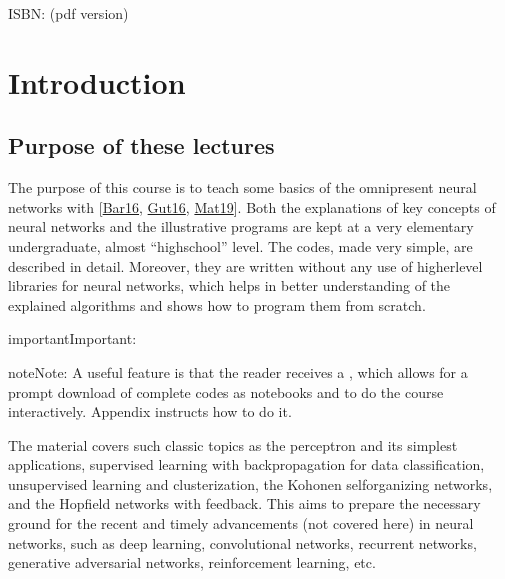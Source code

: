 \documentclass[letterpaper,10pt,english]{jupyterBook}
\begin{document}
\sphinxAtStartPar
ISBN:  (pdf version) 


\chapter{Introduction}
\label{\detokenize{docs/intro:introduction}}\label{\detokenize{docs/intro::doc}}

\section{Purpose of these lectures}
\label{\detokenize{docs/intro:purpose-of-these-lectures}}
\sphinxAtStartPar
The purpose of this course is to teach some basics of the omnipresent neural networks with  {[}\hyperlink{cite.docs/conclusion:id5}{Bar16}, \hyperlink{cite.docs/conclusion:id3}{Gut16}, \hyperlink{cite.docs/conclusion:id2}{Mat19}{]}. Both the explanations of key concepts of neural networks and the illustrative programs are kept at a very elementary undergraduate, almost “high\sphinxhyphen{}school” level. The codes, made very simple, are described in detail. Moreover, they are written without any use of higher\sphinxhyphen{}level libraries for neural networks, which helps in better understanding of the explained algorithms and shows how to program them from scratch.

\begin{sphinxadmonition}{important}{Important:}
\sphinxAtStartPar
{}
\end{sphinxadmonition}

\begin{sphinxadmonition}{note}{Note:}
\sphinxAtStartPar
A useful feature is that the reader receives a , which allows for
a prompt download of complete codes as
 notebooks and to do the course interactively.
Appendix {\hyperref[\detokenize{docs/appendix:app-run}]{}} instructs how to do it.
\end{sphinxadmonition}

\sphinxAtStartPar
The material covers such classic topics as the perceptron and its simplest applications, supervised learning with back\sphinxhyphen{}propagation for data classification, unsupervised learning and clusterization, the Kohonen self\sphinxhyphen{}organizing networks, and the Hopfield networks with feedback. This aims to prepare the necessary ground for the recent and timely advancements (not covered here) in neural networks, such as deep learning, convolutional networks, recurrent networks, generative adversarial networks, reinforcement learning, etc.
\end{document}
